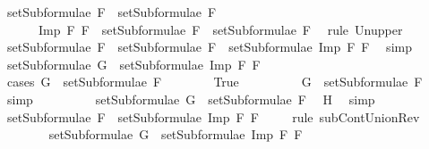 \begin{isabellebody}
\ {\isachardoublequoteopen}setSubformulae\ F{}\ {\isasymunion}\ setSubformulae\ F{}\ {\isasymsubseteq}\ \isanewline
\ \ \ \ \ \ {\isacharbraceleft}Imp\ F{}\ F{}{\isacharbraceright}\ {\isasymunion}\ {\isacharparenleft}setSubformulae\ F{}\ {\isasymunion}\ setSubformulae\ F{}{\isacharparenright}{\isachardoublequoteclose}\ \isamarkupfalse%
\ {\isacharparenleft}rule\ Un{\isacharunderscore}upper{}{\isacharparenright}\isanewline
\ \ \ \ \isamarkupfalse%
\ \isamarkupfalse%
\ {}{\isacharcolon}{\isachardoublequoteopen}setSubformulae\ F{}\ {\isasymunion}\ setSubformulae\ F{}\ {\isasymsubseteq}\ setSubformulae\ {\isacharparenleft}Imp\ F{}\ F{}{\isacharparenright}{\isachardoublequoteclose}\ \isamarkupfalse%
\ simp\isanewline
\ \ \ \ \isamarkupfalse%
\ \isamarkupfalse%
\ {\isachardoublequoteopen}setSubformulae\ G\ {\isasymsubseteq}\ setSubformulae\ {\isacharparenleft}Imp\ F{}\ F{}{\isacharparenright}{\isachardoublequoteclose}\isanewline
\ \ \ \ \isamarkupfalse%
\ {\isacharparenleft}cases\ {\isachardoublequoteopen}G\ {\isasymin}\ setSubformulae\ F{}{\isachardoublequoteclose}{\isacharparenright}\isanewline
\ \ \ \ \ \ \isamarkupfalse%
\ True\isanewline
\ \ \ \ \ \ \isamarkupfalse%
\ \isamarkupfalse%
\ {\isachardoublequoteopen}G\ {\isasymin}\ setSubformulae\ F{}{\isachardoublequoteclose}\ \isamarkupfalse%
\ simp\isanewline
\ \ \ \ \ \ \isamarkupfalse%
\ \isamarkupfalse%
\ {}{\isacharcolon}{\isachardoublequoteopen}setSubformulae\ G\ {\isasymsubseteq}\ setSubformulae\ F{}{\isachardoublequoteclose}\ \isamarkupfalse%
\ H{}\ \isamarkupfalse%
\ simp\isanewline
\ \ \ \ \ \ \isamarkupfalse%
\ {}{\isacharcolon}{\isachardoublequoteopen}setSubformulae\ F{}\ {\isasymsubseteq}\ setSubformulae\ {\isacharparenleft}Imp\ F{}\ F{}{\isacharparenright}{\isachardoublequoteclose}\ \isamarkupfalse%
\ {}\ \isamarkupfalse%
\ {\isacharparenleft}rule\ subContUnionRev{}{\isacharparenright}\ \ \isanewline
\ \ \ \ \ \ \isamarkupfalse%
\ {\isachardoublequoteopen}setSubformulae\ G\ {\isasymsubseteq}\ setSubformulae\ {\isacharparenleft}Imp\ F{}\ F{}{\isacharparenright}{\isachardoublequoteclose}\ \isamarkupfalse%

\end{isabellebody}
